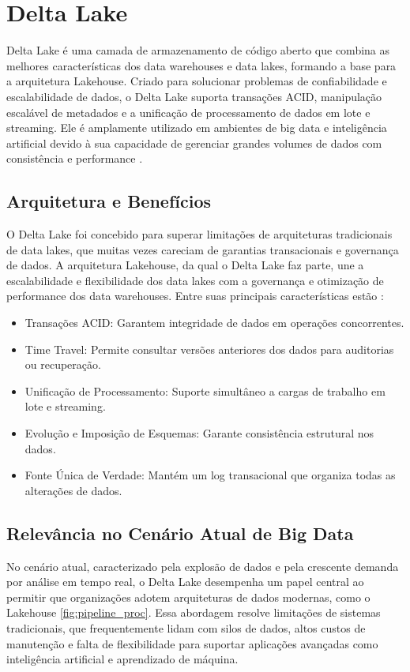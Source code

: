 \section{Delta Lake}
Delta Lake é uma camada de armazenamento de código aberto que combina as melhores características dos data warehouses e data lakes, 
formando a base para a arquitetura Lakehouse. Criado para solucionar problemas de confiabilidade e escalabilidade de dados, o Delta 
Lake suporta transações ACID, manipulação escalável de metadados e a unificação de processamento de dados em lote e streaming. Ele 
é amplamente utilizado em ambientes de big data e inteligência artificial devido à sua capacidade de gerenciar grandes volumes de 
dados com consistência e performance \cite{lee2024delta}. 

\subsection{Arquitetura e Benefícios}
O Delta Lake foi concebido para superar limitações de arquiteturas tradicionais de data lakes, que muitas vezes careciam de garantias transacionais e governança de dados. A arquitetura Lakehouse, da qual o Delta Lake faz parte, une a escalabilidade e flexibilidade dos data lakes com a governança e otimização de performance dos data warehouses. Entre suas principais características estão \cite{lee2024delta}:
\begin{itemize}[nosep, topsep=0pt, partopsep=0pt]
    \item Transações ACID: Garantem integridade de dados em operações concorrentes.
    \item Time Travel: Permite consultar versões anteriores dos dados para auditorias ou recuperação.
    \item Unificação de Processamento: Suporte simultâneo a cargas de trabalho em lote e streaming.
    \item Evolução e Imposição de Esquemas: Garante consistência estrutural nos dados.
    \item Fonte Única de Verdade: Mantém um log transacional que organiza todas as alterações de dados.
\end{itemize}

\subsection{Relevância no Cenário Atual de Big Data}
No cenário atual, caracterizado pela explosão de dados e pela crescente demanda por análise em tempo real, o Delta Lake desempenha 
um papel central ao permitir que organizações adotem arquiteturas de dados modernas, como o Lakehouse \ref{fig:pipeline_proc}. Essa abordagem resolve limitações 
de sistemas tradicionais, que frequentemente lidam com silos de dados, altos custos de manutenção e falta de flexibilidade para suportar 
aplicações avançadas como inteligência artificial e aprendizado de máquina.

